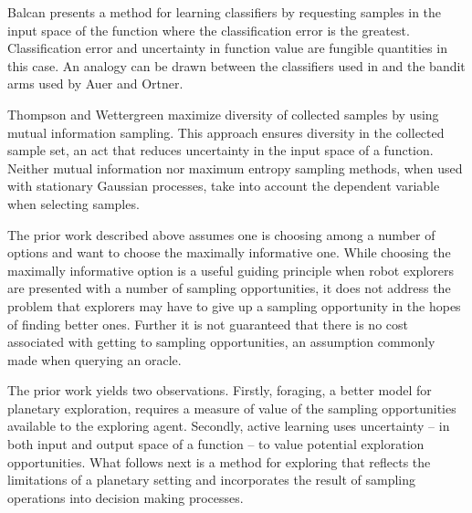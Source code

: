 Balcan \cite{balcan2006agnostic} presents a method for learning classifiers by
requesting samples in the input space of the function where the classification
error is the greatest.  Classification error and uncertainty in function value
are fungible quantities in this case.  An analogy can be drawn between
the classifiers used in \cite{balcan2006agnostic} and the bandit arms used by
Auer and Ortner\cite{auer2010ucb}.

Thompson and Wettergreen \cite{thompson2008intelligent} maximize diversity of
collected samples by using mutual information sampling.  This approach ensures
diversity in the collected sample set, an act that reduces uncertainty in the
input space of a function.  Neither mutual information nor maximum entropy
sampling methods, when used with stationary Gaussian processes, take into
account the dependent variable when selecting samples.  

The prior work described above assumes one is choosing among a number of
options and want to choose the maximally informative one.  While choosing the
maximally informative option is a useful guiding principle when robot explorers
are presented with a number of sampling opportunities, it does not address the
problem that explorers may have to give up a sampling opportunity in the hopes
of finding better ones.  Further it is not guaranteed that there is no cost
associated with getting to sampling opportunities, an assumption commonly made when querying an oracle.

The prior work yields two observations.  Firstly, foraging, a better model for
planetary exploration, requires a measure of value of the sampling
opportunities available to the exploring agent.  Secondly, active learning uses
uncertainty -- in both input and output space of a function -- to value potential exploration opportunities.  What follows next is a method
for exploring that reflects the limitations of a planetary setting and
incorporates the result of sampling operations into decision making processes.
